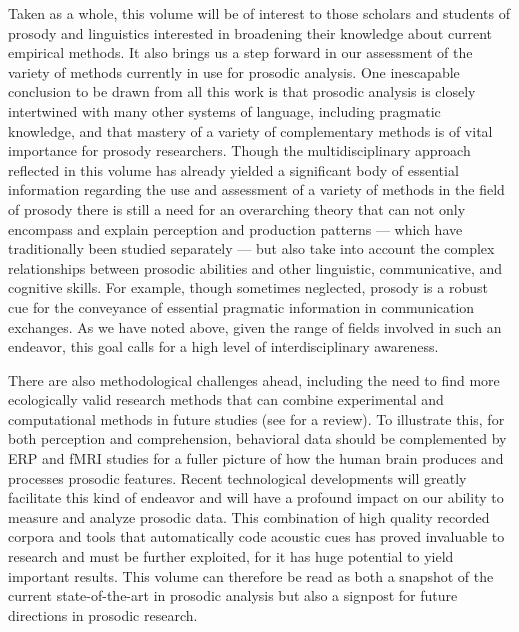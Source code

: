 \documentclass[output=paper]{langsci/langscibook}
\begin{document}
\newpage 

Taken as a whole, this volume will be of interest to those scholars and students of prosody and linguistics interested in broadening their knowledge about current empirical methods. It also brings us a step forward in our assessment of the variety of methods currently in use for prosodic analysis. One inescapable conclusion to be drawn from all this work is that prosodic analysis is closely intertwined with many other systems of language, including pragmatic knowledge, and that mastery of a variety of complementary methods is of vital importance for prosody researchers. Though the multidisciplinary approach reflected in this volume has already yielded a significant body of essential information regarding the use and assessment of a variety of methods in the field of prosody there is still a need for an overarching theory that can not only encompass and explain perception and production patterns — which have traditionally been studied separately — but also take into account the complex relationships between prosodic abilities and other linguistic, communicative, and cognitive skills. For example, though sometimes neglected, prosody is a robust cue for the conveyance of essential pragmatic information in communication exchanges. As we have noted above, given the range of fields involved in such an endeavor, this goal calls for a high level of interdisciplinary awareness. 

There are also methodological challenges ahead, including the need to find more ecologically valid research methods that can combine experimental and computational methods in future studies (see \citealt{Prieto.2012} for a review). To illustrate this, for both perception and comprehension, behavioral data should be complemented by ERP and fMRI studies for a fuller picture of how the human brain produces and processes prosodic features. Recent technological developments will greatly facilitate this kind of endeavor and will have a profound impact on our ability to measure and analyze prosodic data. This combination of high quality recorded corpora and tools that automatically code acoustic cues has proved invaluable to research and must be further exploited, for it has huge potential to yield important results. This volume can therefore be read as both a snapshot of the current state-of-the-art in prosodic analysis but also a signpost for future directions in prosodic research.


{\sloppy
\printbibliography[heading=subbibliography,notkeyword=this]
}
\end{document}
